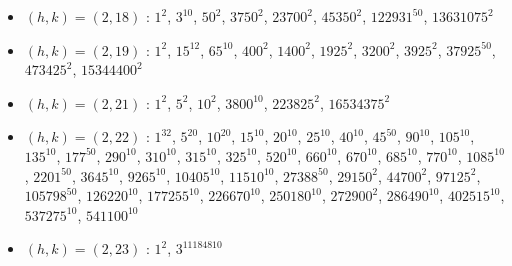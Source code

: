 \begin{itemize}
\item $(h,k)=(2,18)$ : $1^{2}$, $3^{10}$, $50^{2}$, $3750^{2}$, $23700^{2}$, $45350^{2}$, $122931^{50}$, $13631075^{2}$
\item $(h,k)=(2,19)$ : $1^{2}$, $15^{12}$, $65^{10}$, $400^{2}$, $1400^{2}$, $1925^{2}$, $3200^{2}$, $3925^{2}$, $37925^{50}$, $473425^{2}$, $15344400^{2}$
\item $(h,k)=(2,21)$ : $1^{2}$, $5^{2}$, $10^{2}$, $3800^{10}$, $223825^{2}$, $16534375^{2}$
\item $(h,k)=(2,22)$ : $1^{32}$, $5^{20}$, $10^{20}$, $15^{10}$, $20^{10}$, $25^{10}$, $40^{10}$, $45^{50}$, $90^{10}$, $105^{10}$, $135^{10}$, $177^{50}$, $290^{10}$, $310^{10}$, $315^{10}$, $325^{10}$, $520^{10}$, $660^{10}$, $670^{10}$, $685^{10}$, $770^{10}$, $1085^{10}$, $2201^{50}$, $3645^{10}$, $9265^{10}$, $10405^{10}$, $11510^{10}$, $27388^{50}$, $29150^{2}$, $44700^{2}$, $97125^{2}$, $105798^{50}$, $126220^{10}$, $177255^{10}$, $226670^{10}$, $250180^{10}$, $272900^{2}$, $286490^{10}$, $402515^{10}$, $537275^{10}$, $541100^{10}$
\item $(h,k)=(2,23)$ : $1^{2}$, $3^{11184810}$

\end{itemize}
